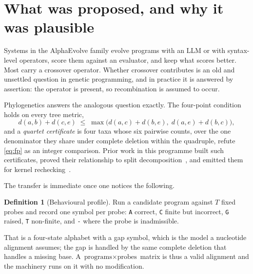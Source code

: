 \documentclass[11pt,a4paper]{article}
\theoremstyle{definition}
\newtheorem{definition}[theorem]{Definition}
\theoremstyle{remark}
\begin{document}
\begin{abstract}
We report what survives: the proof-carrying fitness ladder, which is independent
of this result; the twelve measurement guards, three of which caught this
failure; and a released dataset of $49$ evolved program populations with
behavioural profiles, certificates and fitness traces.
\end{abstract}

\section{What was proposed, and why it was plausible}

Systems in the AlphaEvolve family evolve programs with an LLM or with
syntax-level operators, score them against an evaluator, and keep what scores
better. Most carry a crossover operator. Whether crossover contributes is an old
and unsettled question in genetic programming, and in practice it is answered by
assertion: the operator is present, so recombination is assumed to occur.

Phylogenetics answers the analogous question exactly. The four-point
condition~\cite{buneman} holds on every tree metric,
\begin{equation}\label{eq:fp}
  d(a,b) + d(c,e) \;\le\; \max\bigl(d(a,c)+d(b,e),\; d(a,e)+d(b,c)\bigr),
\end{equation}
and a \emph{quartet certificate} is four taxa whose six pairwise counts, over the
one denominator they share under complete deletion within the quadruple, refute
\eqref{eq:fp} as an integer comparison. Prior work in this programme built such
certificates, proved their relationship to split
decomposition~\cite{bandeltdress}, and emitted them for kernel
rechecking~\cite{paperf,paperg}.

The transfer is immediate once one notices the following.

\begin{definition}[Behavioural profile]\label{def:profile}
Run a candidate program against $T$ fixed probes and record one symbol per probe:
\texttt{A} correct, \texttt{C} finite but incorrect, \texttt{G} raised,
\texttt{T} non-finite, and \texttt{-} where the probe is inadmissible.
\end{definition}

That is a four-state alphabet with a gap symbol, which is the model a nucleotide
alignment assumes; the gap is handled by the same complete deletion that handles
a missing base. A $\text{programs} \times \text{probes}$ matrix is thus a valid
alignment and the machinery runs on it with no modification.
\end{document}

